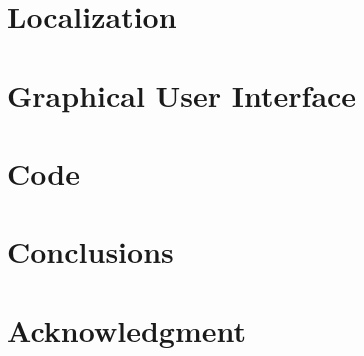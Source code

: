\documentclass[journal]{IEEEtran}
\begin{document}
\section{Localization}
  

\section{Graphical User Interface}
  
  
\section{Code}
  

\section{Conclusions}
  

\appendices


\section*{Acknowledgment}
  



\ifCLASSOPTIONcaptionsoff
  \newpage
\fi







%
%


\end{document}
